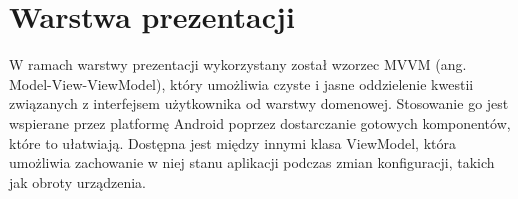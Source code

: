 




\section{Warstwa prezentacji}
\label{wzorzec-mvvm}

W ramach warstwy prezentacji wykorzystany został wzorzec MVVM (ang. Model-View-ViewModel), który umożliwia czyste i jasne oddzielenie kwestii związanych z interfejsem użytkownika od warstwy domenowej. Stosowanie go jest wspierane przez platformę Android poprzez dostarczanie gotowych komponentów, które to ułatwiają. Dostępna jest między innymi klasa ViewModel, która umożliwia zachowanie w niej stanu aplikacji podczas zmian konfiguracji, takich jak obroty urządzenia.

